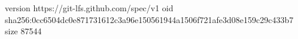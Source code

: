version https://git-lfs.github.com/spec/v1
oid sha256:0cc6504dc0e871731612c3a96e150561944a1506f721afe3d08e159c29c433b7
size 87544
